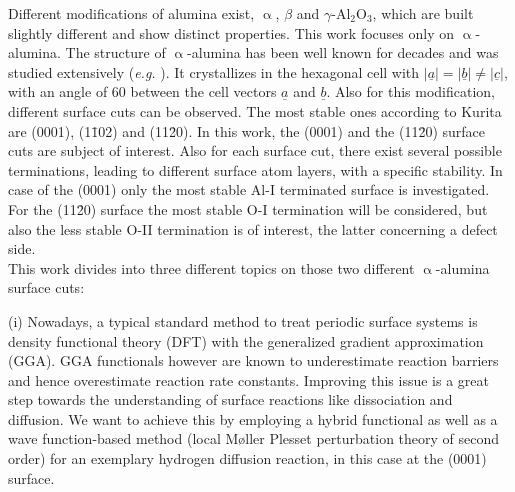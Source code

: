 \documentclass[11pt,DIV=13,BCOR=5mm,a4paper,headinclude]{scrbook}
\renewcommand{\vec}[1]{\underline{#1}}
\begin{document}
Different modifications of alumina exist, $\upalpha$, $\beta$ and $\gamma$-Al$_2$O$_3$, which are built slightly different and show distinct properties.
This work focuses only on $\upalpha$-alumina.
The structure of $\upalpha$-alumina has been well known for decades and was studied extensively (\textit{e.g.} \cite{Passerini1930,wyckoff1931}).
It crystallizes in the hexagonal cell with $|\vec{a}|=|\vec{b}|\neq |\vec{c}|$, with an angle of $60$\textdegree{} between the cell vectors $\vec{a}$ and $\vec{b}$.
Also for this modification, different surface cuts can be observed. 
The most stable ones according to Kurita\cite{kuri10} are (0001), (1\=102) and (11\=20).
In this work, the (0001) and the (11\=20) surface cuts are subject of interest.
Also for each surface cut, there exist several possible terminations, leading to different surface atom layers, with a specific stability.
In case of the (0001) only the most stable Al-I terminated surface is investigated.
For the (11\=20) surface the most stable O-I termination will be considered, but also the less stable O-II termination is of interest, the latter concerning a defect side.
\\

This work divides into three different topics on those two different $\upalpha$-alumina surface cuts:

(i) Nowadays, a typical standard method to treat periodic surface systems is density functional theory (DFT) with the generalized gradient approximation (GGA). %
GGA functionals however are known to underestimate reaction barriers and hence overestimate reaction rate constants.
Improving this issue is a great step towards the understanding of surface reactions like dissociation and diffusion.
We want to achieve this by employing a hybrid functional as well as a wave function-based method (local M\o{}ller Plesset perturbation theory of second order) for an exemplary hydrogen diffusion reaction, in this case at the (0001) surface.
\end{document}
